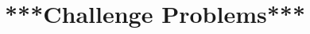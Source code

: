\documentclass[../basic_graph_theory.tex]{subfiles}
\begin{document}
\chapter{***Challenge Problems***}
\setcounter{chapter}{10} %
\setcounter{section}{0}
\setcounter{equation}{0}
\setcounter{figure}{0}
\label{chap:challenge_problems}
\end{document}
